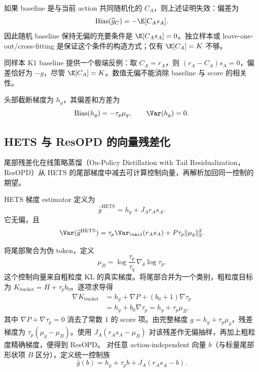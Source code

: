 如果 baseline 是与当前 action 共同随机化的 $C_A$，则上述证明失效：偏差为
\begin{equation}
 \operatorname{Bias}(\widehat g_C)=-\E[C_As_A].
 \label{eq:chapter3-random-baseline-bias}
\end{equation}
因此随机 baseline 保持无偏的充要条件是 $\E[C_As_A]=0$。独立样本或 leave-one-out/cross-fitting 是保证这个条件的构造方式；仅有 $\E[C_A]=K$ 不够。

同样本 K1 baseline 提供一个极端反例：取 $C_A=r_A$，则 $(r_A-C_A)s_A=0$，偏差恰好为 $-g$，尽管 $\E[C_A]=K$。数值无偏不能消除 baseline 与 score 的相关性。

头部截断梯度为 $h_g$，其偏差和方差为
\begin{equation}
 \operatorname{Bias}(h_g)=-\tau_p\mu_g,
 \qquad \Var(h_g)=0.
 \label{eq:chapter3-head-grad-bias}
\end{equation}

\subsection{HETS 与 ResOPD 的向量残差化}

尾部残差化在线策略蒸馏（On-Policy Distillation with Tail Residualization，ResOPD）从 HETS 的尾部梯度中减去可计算控制向量，再解析加回同一控制的期望。

HETS 梯度 estimator 定义为
\begin{equation}
 \widehat g^{\mathrm{HETS}}=h_g+J_A r_As_A.
 \label{eq:chapter3-hets-grad}
\end{equation}
它无偏，且
\begin{equation}
 \Var(\widehat g^{\mathrm{HETS}})
 =\tau_p\Var_{\tail}(r_As_A)+P\tau_p\lVert\mu_g\rVert_2^2.
 \label{eq:chapter3-hets-var}
\end{equation}

将尾部聚合为伪 token，定义
\begin{equation}
 \mu_B=\log\frac{\tau_p}{\tau_q}\,\nabla_\theta\log\tau_p.
 \label{eq:chapter3-resopd-control}
\end{equation}
这个控制向量来自粗粒度 KL 的真实梯度。将尾部合并为一个类别，粗粒度目标为 $K_{\mathrm{bucket}}=H+\tau_pb_0$。逐项求导得
\begin{align*}
 \nabla K_{\mathrm{bucket}}
 &=h_g+\nabla P+(b_0+1)\nabla\tau_p\\
 &=h_g+b_0\nabla\tau_p
 =h_g+\tau_p\mu_B.
\end{align*}
其中 $\nabla P+\nabla\tau_p=0$ 消去了常数 $1$ 的 score 项。由完整梯度 $g=h_g+\tau_p\mu_g$，残差梯度为 $\tau_p(\mu_g-\mu_B)$。使用 $J_A(r_As_A-\mu_B)$ 对该残差作无偏抽样，再加上粗粒度精确梯度，便得到 ResOPD。
对任意 action-independent 向量 $b$（与标量尾部形状项 $B$ 区分），定义统一控制族
\begin{equation}
 \widehat g(b)=h_g+\tau_pb+J_A(r_As_A-b).
 \label{eq:chapter3-control-family}
\end{equation}


